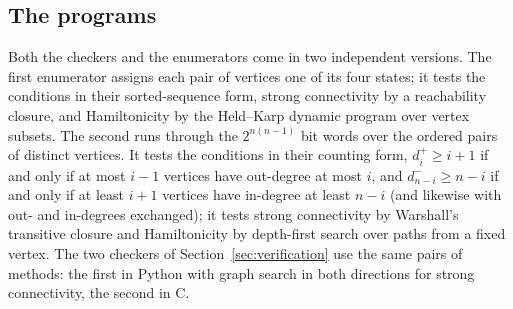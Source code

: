 \documentclass[11pt]{article}
\begin{document}
\begin{appendices}
\section{The programs}\label{app:programs}
Both the checkers and the enumerators come in two independent versions. The first enumerator assigns each pair of vertices one of its four states; it tests the conditions in their sorted-sequence form, strong connectivity by a reachability closure, and Hamiltonicity by the Held--Karp dynamic program over vertex subsets. The second runs through the $2^{n(n-1)}$ bit words over the ordered pairs of distinct vertices. It tests the conditions in their counting form, $d^+_i\ge i+1$ if and only if at most $i-1$ vertices have out-degree at most $i$, and $d^-_{n-i}\ge n-i$ if and only if at least $i+1$ vertices have in-degree at least $n-i$ (and likewise with out- and in-degrees exchanged); it tests strong connectivity by Warshall's transitive closure and Hamiltonicity by depth-first search over paths from a fixed vertex. The two checkers of Section~\ref{sec:verification} use the same pairs of methods: the first in Python with graph search in both directions for strong connectivity, the second in C.
\end{appendices}
\end{document}
